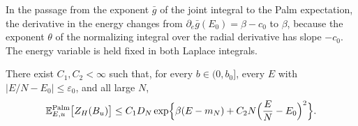 In the passage from the exponent $\bar g$ of the joint integral to the Palm expectation, the derivative in the energy changes from $\partial_e\bar g(E_0)=\beta-c_0$ to $\beta$, because the exponent $\theta$ of the normalizing integral over the radial derivative has slope $-c_0$. The energy variable is held fixed in both Laplace integrals.

\begin{proposition}\label{prop:mb-upper}
There exist $C_1,C_2<\infty$ such that, for every $b\in(0,b_0]$, every $E$ with $|E/N-E_0|\le\varepsilon_0$, and all large $N$,
\begin{equation}\label{eq:mb-upper}
\mathbb E^{\mathrm{Palm}}_{E,u}\bigl[Z_H(B_u)\bigr]\le C_1D_N\exp\Bigl\{\beta(E-m_N)+C_2N\Bigl(\frac EN-E_0\Bigr)^2\Bigr\}.
\end{equation}
\end{proposition}

